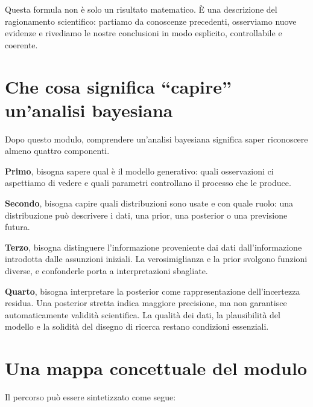 \documentclass[
  italian,
  letterpaper,
  a4paper,
  11pt,
  open=any]{scrbook}
\theoremstyle{plain}
\theoremstyle{definition}
\theoremstyle{definition}
\theoremstyle{remark}
\begin{document}
Questa formula non è solo un risultato matematico. È una descrizione del
ragionamento scientifico: partiamo da conoscenze precedenti, osserviamo
nuove evidenze e rivediamo le nostre conclusioni in modo esplicito,
controllabile e coerente.

\section*{Che cosa significa ``capire'' un'analisi
bayesiana}\label{che-cosa-significa-capire-unanalisi-bayesiana}


Dopo questo modulo, comprendere un'analisi bayesiana significa saper
riconoscere almeno quattro componenti.

\textbf{Primo}, bisogna sapere qual è il modello generativo: quali
osservazioni ci aspettiamo di vedere e quali parametri controllano il
processo che le produce.

\textbf{Secondo}, bisogna capire quali distribuzioni sono usate e con
quale ruolo: una distribuzione può descrivere i dati, una prior, una
posterior o una previsione futura.

\textbf{Terzo}, bisogna distinguere l'informazione proveniente dai dati
dall'informazione introdotta dalle assunzioni iniziali. La
verosimiglianza e la prior svolgono funzioni diverse, e confonderle
porta a interpretazioni sbagliate.

\textbf{Quarto}, bisogna interpretare la posterior come rappresentazione
dell'incertezza residua. Una posterior stretta indica maggiore
precisione, ma non garantisce automaticamente validità scientifica. La
qualità dei dati, la plausibilità del modello e la solidità del disegno
di ricerca restano condizioni essenziali.

\section*{Una mappa concettuale del
modulo}\label{una-mappa-concettuale-del-modulo}


Il percorso può essere sintetizzato come segue:
\end{document}
